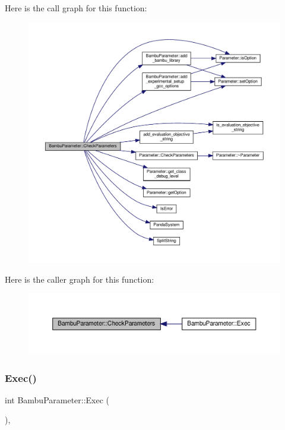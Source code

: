 Here is the call graph for this function\+:
\nopagebreak
\begin{figure}[H]
\begin{center}
\leavevmode
\includegraphics[width=350pt]{d4/d67/classBambuParameter_aa1f5172814a5b7937b261509db53da9d_cgraph}
\end{center}
\end{figure}
Here is the caller graph for this function\+:
\nopagebreak
\begin{figure}[H]
\begin{center}
\leavevmode
\includegraphics[width=350pt]{d4/d67/classBambuParameter_aa1f5172814a5b7937b261509db53da9d_icgraph}
\end{center}
\end{figure}
\mbox{\label{classBambuParameter_ad89abd3e8793ce6f8324d3acc74b2faa}} 
\subsubsection{\texorpdfstring{Exec()}{Exec()}}
{\footnotesize\ttfamily int Bambu\+Parameter\+::\+Exec (\begin{DoxyParamCaption}{ }\end{DoxyParamCaption})\hspace{0.3cm}{\ttfamily [override]}, {\ttfamily [virtual]}}



